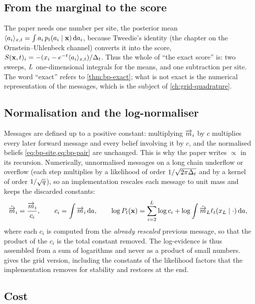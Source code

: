 \subsection{From the marginal to the score}

The paper needs one number per site, the posterior mean
$\langle a_{i} \rangle_{x,t}=\int a_i\,p_t(a_i\mid\mathbf{x})\,\mathrm{d} a_i$, because Tweedie's identity
(the chapter on the Ornstein--Uhlenbeck channel) converts it into the score,
$S(\mathbf{x},t)_i=-(x_i-e^{-t}\langle a_{i} \rangle_{x,t})/\Delta_t$. Thus the whole of ``the exact score''
is: two sweeps, $L$ one-dimensional integrals for the means, and one subtraction
per site. The word ``exact'' refers to \cref{thm:bp-exact}; what is not exact is the
numerical representation of the messages, which is the subject of
\cref{ch:grid-quadrature}.

\subsection{Normalisation and the log-normaliser}
\label{sec:bp-normalisation}

Messages are defined up to a positive constant: multiplying $\overrightarrow{m}_i$ by $c$ multiplies
every later forward message and every belief involving it by $c$, and the
normalised beliefs \cref{eq:bp-site,eq:bp-pair} are unchanged. This is why the paper
writes $\propto$ in its recursion. Numerically, unnormalised messages on a long chain
underflow or overflow (each step multiplies by a likelihood of order
$1/\sqrt{2\pi\Delta_t}$ and by a kernel of order $1/\sqrt{q}$), so an implementation
rescales each message to unit mass and keeps the discarded constants:
\begin{equation}
  \tilde{\overrightarrow{m}}_{i}=\frac{\overrightarrow{m}_i}{c_i},\qquad c_i=\int\overrightarrow{m}_i\,\mathrm{d} a,\qquad
  \log P_t(\mathbf{x})=\sum_{i=2}^{L}\log c_i+\log\int\tilde{\overrightarrow{m}}_L\ell_t(x_L\mid\cdot)\,\mathrm{d} a,
  \label{eq:bp-logZ}
\end{equation}
where each $c_i$ is computed from the \emph{already rescaled} previous message, so
that the product of the $c_i$ is the total constant removed. The log-evidence is thus
assembled from a sum of logarithms and never as a product of small numbers.
 gives the grid version, including the constants of the
likelihood factors that the implementation removes for stability and restores at the
end.

\subsection{Cost}

